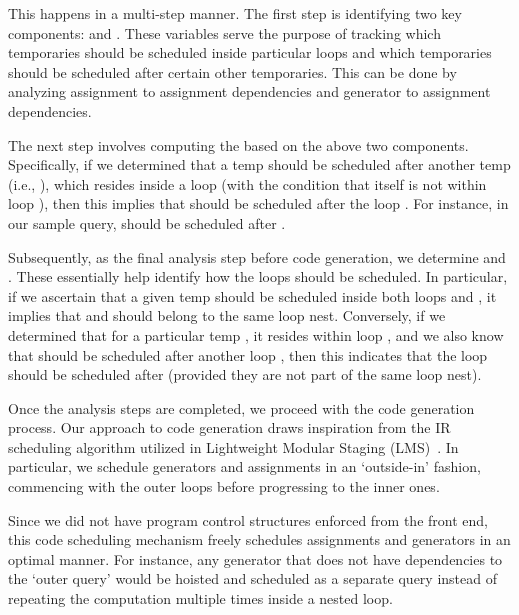 \documentclass[runningheads]{llncs}
\begin{document}
This happens in a multi-step manner.
The first step is identifying two key
components:  and .
These variables serve the purpose of tracking which temporaries should be scheduled
inside particular loops and which temporaries should be scheduled after
certain other temporaries.
This can be done by analyzing assignment to assignment dependencies and
generator to assignment dependencies.

The next step involves computing the  based on the above two components.
Specifically, if we determined that a temp  should be scheduled after
another temp  (i.e., ), which resides inside a loop 
(with the condition that  itself is not within loop ),
then this implies that  should be scheduled after the loop .
For instance, in our sample query,  should be scheduled after .

Subsequently, as the final analysis step before code generation, we determine
 and .
These essentially help identify how the loops should be scheduled.
In particular, if we ascertain that a given temp  should be scheduled
inside both loops  and , it implies that  and
 should belong to the same loop nest.
Conversely, if we determined that for a particular temp ,
it resides within loop , and we also know that  should be
scheduled after another loop , then this indicates that the loop 
should be scheduled after  (provided they are not part of the same loop nest).

Once the analysis steps are completed, we proceed with the code
generation process.
Our approach to code generation draws inspiration from the IR scheduling
algorithm utilized in Lightweight Modular Staging (LMS)~\cite{lms}.
In particular, we schedule generators and assignments in an
`outside-in' fashion, commencing with the outer loops before
progressing to the inner ones.

Since we did not have program control structures enforced from the front end,
this code scheduling mechanism freely schedules assignments and generators
in an optimal manner.
For instance, any generator that does not have dependencies to the `outer query'
would be hoisted and scheduled as a separate query instead of repeating the
computation multiple times inside a nested loop.
\end{document}
